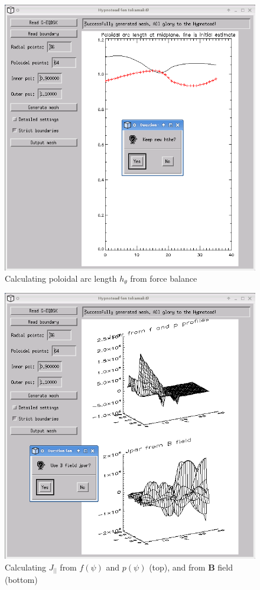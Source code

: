 \documentclass[12pt, a4paper]{article}
\newcommand{\hthe}{\ensuremath{h_\theta}}
\newcommand{\Vec}[1]{\ensuremath{\mathbf{#1}}}
\newcommand{\Jpar}{J_{||}}
\begin{document}
\clearpage

\begin{figure}[h!]
  \centering
  \includegraphics[width=0.5\paperwidth, keepaspectratio]{screen_9.png}
  \caption{Calculating poloidal arc length $\hthe$ from force balance}
  \label{fig:screen_9}
\end{figure}

\clearpage

\begin{figure}[h!]
  \centering
  \includegraphics[width=0.5\paperwidth, keepaspectratio]{screen_10.png}
  \caption{Calculating $\Jpar$ from $f\left(\psi\right)$ and $p\left(\psi\right)$ (top), and from $\Vec{B}$ field (bottom)}
  \label{fig:screen_10}
\end{figure}
\end{document}
